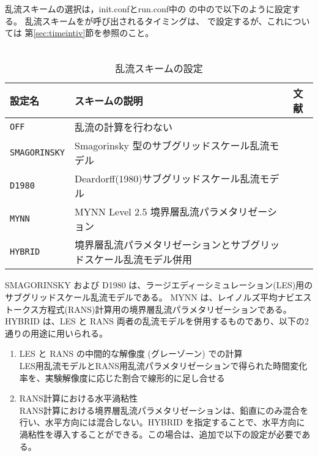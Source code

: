 乱流スキームの選択は，init.confとrun.conf中の
の中ので以下のように設定する。
乱流スキームをが呼び出されるタイミングは、
で設定するが、これについては
第\ref{sec:timeintiv}節を参照のこと。\\

\\

\begin{table}[h]
\begin{center}
  \caption{乱流スキームの設定}
  \label{tab:nml_atm_tb}
  \begin{tabularx}{150mm}{lXX} \hline
    \rowcolor[gray]{0.9}  設定名 & スキームの説明 & 文献\\ \hline
      \verb|OFF|          & 乱流の計算を行わない &  \\
      \verb|SMAGORINSKY|  & Smagorinsky 型のサブグリッドスケール乱流モデル & \citet{smagorinsky_1963,lilly_1962,Brown_etal_1994,Scotti_1993} \\
      \verb|D1980|        & Deardorff(1980)サブグリッドスケール乱流モデル & \citet{Deardorff_1980} \\
      \verb|MYNN|         & MYNN Level 2.5 境界層乱流パラメタリゼーション & \citet{my_1982,nakanishi_2004} \\
      \verb|HYBRID|       & 境界層乱流パラメタリゼーションとサブグリッドスケール乱流モデル併用 & \\
    \hline
  \end{tabularx}
\end{center}
\end{table}

SMAGORINSKY および D1980 は、ラージエディーシミュレーション(LES)用のサブグリッドスケール乱流モデルである。
MYNN は、レイノルズ平均ナビエストークス方程式(RANS)計算用の境界層乱流パラメタリゼーションである。
HYBRID は、LES と RANS 両者の乱流モデルを併用するものであり、以下の2通りの用途に用いられる。
\begin{enumerate}
\item LES と RANS の中間的な解像度 (グレーゾーン) での計算\\
  LES用乱流モデルとRANS用乱流パラメタリゼーションで得られた時間変化率を、実験解像度に応じた割合で線形的に足し合せる
\item RANS計算における水平渦粘性\\
  RANS計算における境界層乱流パラメタリゼーションは、鉛直にのみ混合を行い、水平方向には混合しない。HYBRID を指定することで、水平方向に渦粘性を導入することができる。この場合は、追加で以下の設定が必要である。
\end{enumerate}

